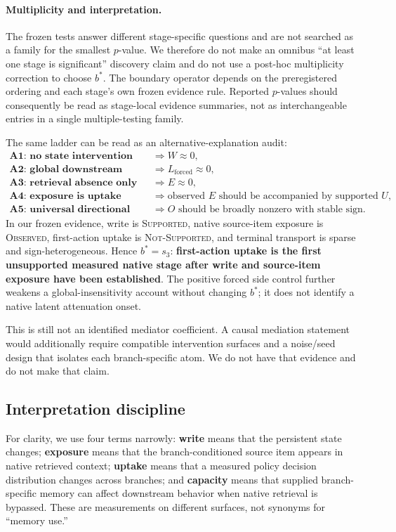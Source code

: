 \paragraph{Multiplicity and interpretation.} The frozen tests answer different stage-specific questions and are not searched as a family for the smallest $p$-value. We therefore do not make an omnibus ``at least one stage is significant'' discovery claim and do not use a post-hoc multiplicity correction to choose $b^*$. The boundary operator depends on the preregistered ordering and each stage's own frozen evidence rule. Reported $p$-values should consequently be read as stage-local evidence summaries, not as interchangeable entries in a single multiple-testing family.

The same ladder can be read as an alternative-explanation audit:
\begin{align*}
\textbf{A1: no state intervention} &\Rightarrow W\approx 0,\\
\textbf{A2: global downstream insensitivity} &\Rightarrow L_{\mathrm{forced}}\approx 0,\\
\textbf{A3: retrieval absence only} &\Rightarrow E\approx 0,\\
\textbf{A4: exposure is uptake} &\Rightarrow \text{observed }E\text{ should be accompanied by supported }U,\\
\textbf{A5: universal directional transport} &\Rightarrow O\text{ should be broadly nonzero with stable sign.}
\end{align*}
In our frozen evidence, write is \textsc{Supported}, native source-item exposure is \textsc{Observed}, first-action uptake is \textsc{Not-Supported}, and terminal transport is sparse and sign-heterogeneous. Hence $b^*=s_3$: \textbf{first-action uptake is the first unsupported measured native stage after write and source-item exposure have been established}. The positive forced side control further weakens a global-insensitivity account without changing $b^*$; it does not identify a native latent attenuation onset.

This is still not an identified mediator coefficient. A causal mediation statement would additionally require compatible intervention surfaces and a noise/seed design that isolates each branch-specific atom. We do not have that evidence and do not make that claim.

\subsection{Interpretation discipline}
For clarity, we use four terms narrowly: \textbf{write} means that the persistent state changes; \textbf{exposure} means that the branch-conditioned source item appears in native retrieved context; \textbf{uptake} means that a measured policy decision distribution changes across branches; and \textbf{capacity} means that supplied branch-specific memory can affect downstream behavior when native retrieval is bypassed. These are measurements on different surfaces, not synonyms for ``memory use.''

